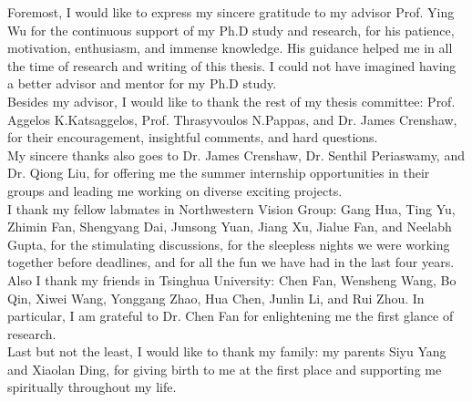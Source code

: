 Foremost, I would like to express my sincere gratitude to my advisor 
Prof. Ying Wu for the continuous support of my Ph.D study and research,
for his patience, motivation, enthusiasm, and immense knowledge.
His guidance helped me in all the time of research and writing of this thesis.
I could not have imagined having a better advisor and mentor for my Ph.D study.\\

Besides my advisor, I would like to thank the rest of my thesis
committee: Prof. Aggelos K.Katsaggelos, Prof. Thrasyvoulos N.Pappas, and
Dr. James Crenshaw, for their encouragement, insightful comments, and hard questions.\\

My sincere thanks also goes to Dr. James Crenshaw, Dr. Senthil Periaswamy,
and Dr. Qiong Liu, for offering me the summer internship opportunities in
their groups and leading me working on diverse exciting projects.\\

I thank my fellow labmates in Northwestern Vision Group: Gang Hua, Ting Yu,
Zhimin Fan, Shengyang Dai, Junsong Yuan, Jiang Xu, Jialue Fan, and Neelabh Gupta,
for the stimulating discussions, for the sleepless nights we were working together
before deadlines, and for all the fun we have had in the last four years.
Also I thank my friends in Tsinghua University: Chen Fan, Wensheng Wang, Bo Qin, Xiwei Wang,
Yonggang Zhao, Hua Chen, Junlin Li, and Rui Zhou. In particular, I am grateful to
Dr. Chen Fan for enlightening me the first glance of research.\\

Last but not the least, I would like to thank my family: my parents Siyu Yang and
Xiaolan Ding, for giving birth to me at the first place and supporting me spiritually
throughout my life.\\
